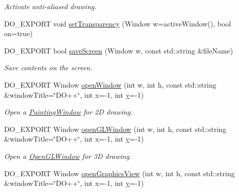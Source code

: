 \begin{DoxyCompactItemize}
\begin{DoxyCompactList}\small\item\em Activate anti-\/aliased drawing. \end{DoxyCompactList}\item 
D\-O\-\_\-\-E\-X\-P\-O\-R\-T void \hyperlink{group___draw2_d_ga2af67563364bb902cb8e00ec6046fda8}{set\-Transparency} (Window w=active\-Window(), bool on=true)
\item 
\hypertarget{group___draw2_d_ga7f40424c6ecca2871552b0fdba3a9a70}{D\-O\-\_\-\-E\-X\-P\-O\-R\-T bool \hyperlink{group___draw2_d_ga7f40424c6ecca2871552b0fdba3a9a70}{save\-Screen} (Window w, const std\-::string \&file\-Name)}\label{group___draw2_d_ga7f40424c6ecca2871552b0fdba3a9a70}

\begin{DoxyCompactList}\small\item\em Save contents on the screen. \end{DoxyCompactList}\item 
\hypertarget{group___window_management_ga0351d84c2f76eafe9ecbad9f28a2bd84}{D\-O\-\_\-\-E\-X\-P\-O\-R\-T Window \hyperlink{group___window_management_ga0351d84c2f76eafe9ecbad9f28a2bd84}{open\-Window} (int w, int h, const std\-::string \&window\-Title=\char`\"{}D\-O++\char`\"{}, int x=-\/1, int \hyperlink{group___channel_accessors_gac90c52c5b3a7b2a7e3761e6e84f25778}{y}=-\/1)}\label{group___window_management_ga0351d84c2f76eafe9ecbad9f28a2bd84}

\begin{DoxyCompactList}\small\item\em Open a \hyperlink{class_d_o_1_1_painting_window}{Painting\-Window} for 2\-D drawing. \end{DoxyCompactList}\item 
\hypertarget{group___window_management_ga54aa2a7fc6c38dc8f1cd7c08cf253aa8}{D\-O\-\_\-\-E\-X\-P\-O\-R\-T Window \hyperlink{group___window_management_ga54aa2a7fc6c38dc8f1cd7c08cf253aa8}{open\-G\-L\-Window} (int w, int h, const std\-::string \&window\-Title=\char`\"{}D\-O++\char`\"{}, int x=-\/1, int \hyperlink{group___channel_accessors_gac90c52c5b3a7b2a7e3761e6e84f25778}{y}=-\/1)}\label{group___window_management_ga54aa2a7fc6c38dc8f1cd7c08cf253aa8}

\begin{DoxyCompactList}\small\item\em Open a \hyperlink{class_d_o_1_1_open_g_l_window}{Open\-G\-L\-Window} for 3\-D drawing. \end{DoxyCompactList}\item 
\hypertarget{group___window_management_ga6bc2d961019076295185e819b956dc48}{D\-O\-\_\-\-E\-X\-P\-O\-R\-T Window \hyperlink{group___window_management_ga6bc2d961019076295185e819b956dc48}{open\-Graphics\-View} (int w, int h, const std\-::string \&window\-Title=\char`\"{}D\-O++\char`\"{}, int x=-\/1, int \hyperlink{group___channel_accessors_gac90c52c5b3a7b2a7e3761e6e84f25778}{y}=-\/1)}\label{group___window_management_ga6bc2d961019076295185e819b956dc48}


\end{DoxyCompactItemize}
